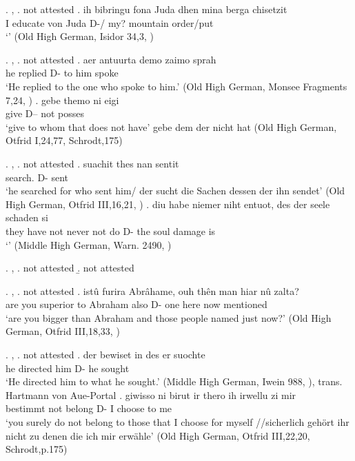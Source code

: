 \ex. , 
\a.  not attested
\bg. ih bibringu fona Juda dhen mina berga chisetzit\\
 I educate von Juda D-/ my? mountain order/put\\
 `' \hfill (Old High German, Isidor 34,3, \citealt[761]{behaghel1923})

\ex. , 
\a.  not attested
\bg. aer antuurta demo zaimo sprah\\
he replied\scsub{[dat]} D- {to him} spoke\scsub{[nom]}\\
`He replied to the one who spoke to him.' \hfill (Old High German, Monsee Fragments 7,24, \citealt[761]{behaghel1923})
\bg. gebe themo ni eigi\\
 give\scsub{[dat]} D-- not posses\scsub{[nom]}\\
 `give to whom that does not have' gebe dem der nicht hat \hfill (Old High German, Otfrid I,24,77, Schrodt,175)

\ex. , 
\a.  not attested
\bg. suachit thes nan sentit\\
 search. D-  sent\\
 `he searched for who sent him/ der sucht die Sachen dessen der ihn sendet' \hfill (Old High German, Otfrid III,16,21, \citealt[761]{behaghel1923})
\bg. diu habe niemer niht entuot, des der seele schaden si\\
 they have not never {not do} D- the soul damage is\scsub{[nom]}\\
 `' \hfill (Middle High German, Warn. 2490, \citealt[761]{behaghel1923})

\ex. , 
\a.  not attested
\b.  not attested

\ex. , 
\a.  not attested
\bg. istû furira Abrâhame, ouh thên man hiar nû zalta?\\
 {are you} {superior to}\scsub{[dat]} Abraham also D- one here now mentioned\scsub{[acc]}\\
 `are you bigger than Abraham and those people named just now?' \hfill (Old High German, Otfrid III,18,33, \citealt[761]{behaghel1923})

\ex. , 
\a.  not attested
\bg. der bewiset in des er suochte\\
 he directed\scsub{[gen]} him D- he sought\scsub{[acc]}\\
 `He directed him to what he sought.' \hfill (Middle High German, Iwein 988, \citealt[761]{behaghel1923}), trans. Hartmann von Aue-Portal
\bg. giwisso ni birut ir thero ih irwellu zi mir\\
 bestimmt not belong\scsub{[gen]}  D- I choose\scsub{[acc]} to me\\
 `you surely do not belong to those that I choose for myself //sicherlich gehört ihr nicht zu denen die ich mir erwähle' \hfill (Old High German, Otfrid III,22,20, Schrodt,p.175)


